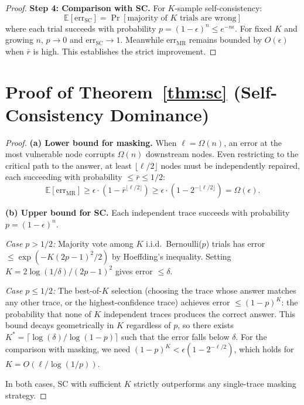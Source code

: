 \documentclass{article}
\begin{document}
\begin{proof}
\textbf{Step 4: Comparison with SC.} For $K$-sample self-consistency:
\begin{equation}
\mathbb{E}[\text{err}_{\text{SC}}] = \Pr[\text{majority of } K \text{ trials are wrong}]
\end{equation}
where each trial succeeds with probability $p = (1-\epsilon)^n \leq e^{-n\epsilon}$. For fixed $K$ and growing $n$, $p \to 0$ and $\text{err}_{\text{SC}} \to 1$. Meanwhile $\text{err}_{\text{MR}}$ remains bounded by $O(\epsilon)$ when $\bar{r}$ is high. This establishes the strict improvement.
\end{proof}

\section{Proof of Theorem~\ref{thm:sc} (Self-Consistency Dominance)}
\label{app:proof_sc}

\begin{proof}
\textbf{(a) Lower bound for masking.} When $\ell = \Omega(n)$, an error at the most vulnerable node corrupts $\Omega(n)$ downstream nodes. Even restricting to the critical path to the answer, at least $\lfloor\ell/2\rfloor$ nodes must be independently repaired, each succeeding with probability $\leq \bar{r} \leq 1/2$:
\begin{equation}
\mathbb{E}[\text{err}_{\text{MR}}] \geq \epsilon \cdot (1 - \bar{r}^{\lfloor\ell/2\rfloor}) \geq \epsilon \cdot (1 - 2^{-\lfloor\ell/2\rfloor}) = \Omega(\epsilon).
\end{equation}

\textbf{(b) Upper bound for SC.} Each independent trace succeeds with probability $p = (1-\epsilon)^n$.

\emph{Case $p > 1/2$:} Majority vote among $K$ i.i.d.\ Bernoulli($p$) trials has error $\leq \exp(-K(2p-1)^2/2)$ by Hoeffding's inequality. Setting $K = 2\log(1/\delta)/(2p-1)^2$ gives error $\leq \delta$.

\emph{Case $p \leq 1/2$:} The best-of-$K$ selection (choosing the trace whose answer matches any other trace, or the highest-confidence trace) achieves error $\leq (1-p)^K$: the probability that none of $K$ independent traces produces the correct answer. This bound decays geometrically in $K$ regardless of $p$, so there exists $K^* = \lceil\log(\delta)/\log(1-p)\rceil$ such that the error falls below $\delta$. For the comparison with masking, we need $(1-p)^K < \epsilon(1-2^{-\ell/2})$, which holds for $K = O(\ell/\log(1/p))$.

In both cases, SC with sufficient $K$ strictly outperforms any single-trace masking strategy.
\end{proof}
\end{document}
